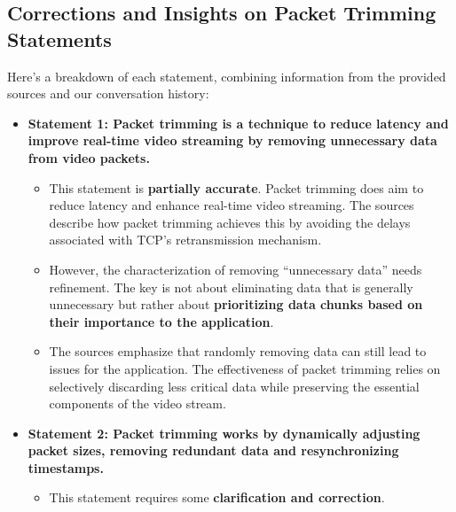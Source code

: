 \documentclass[
]{article}
\author{}
\date{}
\begin{document}
\subsection{Corrections and Insights on Packet Trimming
Statements}\label{corrections-and-insights-on-packet-trimming-statements}

Here's a breakdown of each statement, combining information from the
provided sources and our conversation history:

\begin{itemize}
\item
  \textbf{Statement 1: Packet trimming is a technique to reduce latency
  and improve real-time video streaming by removing unnecessary data
  from video packets.}

  \begin{itemize}
  
  \item
    This statement is \textbf{partially accurate}. Packet trimming does
    aim to reduce latency and enhance real-time video streaming. The
    sources describe how packet trimming achieves this by avoiding the
    delays associated with TCP's retransmission mechanism.
  \item
    However, the characterization of removing ``unnecessary data'' needs
    refinement. The key is not about eliminating data that is generally
    unnecessary but rather about \textbf{prioritizing data chunks based
    on their importance to the application}.
  \item
    The sources emphasize that randomly removing data can still lead to
    issues for the application. The effectiveness of packet trimming
    relies on selectively discarding less critical data while preserving
    the essential components of the video stream.
  \end{itemize}
\item
  \textbf{Statement 2: Packet trimming works by dynamically adjusting
  packet sizes, removing redundant data and resynchronizing timestamps.}

  \begin{itemize}
  
  \item
    This statement requires some \textbf{clarification and correction}.

    \begin{itemize}
    

\end{itemize}
\end{itemize}
\end{itemize}
\end{document}
